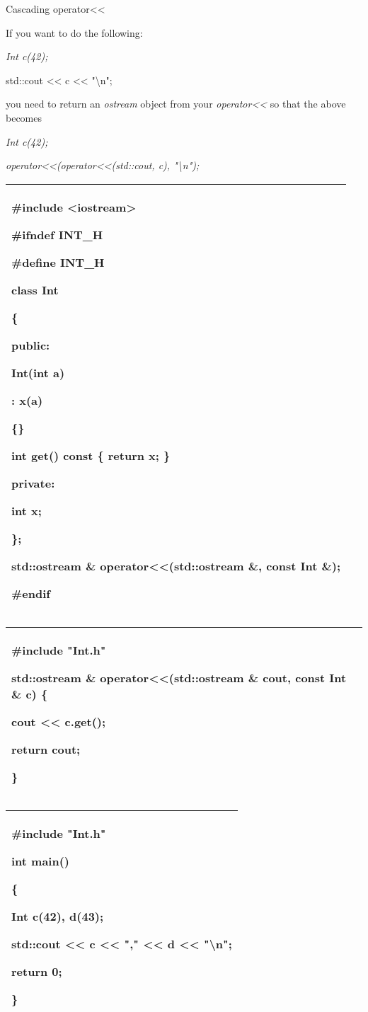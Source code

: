 \documentclass[
]{article}
\begin{document}
Cascading operator\textless\textless{}

If you want to do the following:

\emph{Int c(42);}

std::cout \textless\textless{} c \textless\textless{}
"\textbackslash n";

you need to return an \emph{ostream} object from your
\emph{operator\textless\textless{}} so that the above becomes

\emph{Int c(42);}

\emph{operator\textless\textless(operator\textless\textless(std::cout,
c), "\textbackslash n");}

\begin{longtable}[]{@{}l@{}}
\toprule
\endhead
\begin{minipage}[t]{0.97\columnwidth}\raggedright
\#include \textless iostream\textgreater{}

\#ifndef INT\_H

\#define INT\_H

class Int

\{

public:

Int(int a)

: x(a)

\{\}

int get() const \{ return x; \}

private:

int x;

\};

std::ostream \& operator\textless\textless(std::ostream \&, const Int
\&);

\#endif\strut
\end{minipage}\tabularnewline
\bottomrule
\end{longtable}

\begin{longtable}[]{@{}l@{}}
\toprule
\endhead
\begin{minipage}[t]{0.97\columnwidth}\raggedright
\#include "Int.h"

std::ostream \& operator\textless\textless(std::ostream \& cout, const
Int \& c) \{

cout \textless\textless{} c.get();

return cout;

\}\strut
\end{minipage}\tabularnewline
\bottomrule
\end{longtable}

\begin{longtable}[]{@{}l@{}}
\toprule
\endhead
\begin{minipage}[t]{0.97\columnwidth}\raggedright
\#include "Int.h"

int main()

\{

Int c(42), d(43);

std::cout \textless\textless{} c \textless\textless{} ","
\textless\textless{} d \textless\textless{} "\textbackslash n";

return 0;

\}\strut
\end{minipage}\tabularnewline
\bottomrule
\end{longtable}
\end{document}
